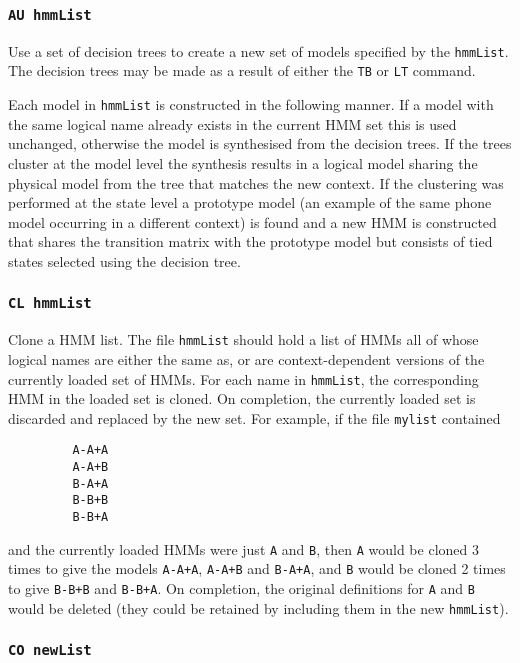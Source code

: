 \subsubsection*{\tt AU hmmList}

Use a set of decision trees to create a new set of models specified
by the \texttt{hmmList}.  The decision trees may be made as a result
of either the \texttt{TB} or \texttt{LT} command.  

Each model in \texttt{hmmList} is constructed in the following manner.
If a model with the same logical name already exists in the
current  HMM set this is used unchanged, otherwise the model is
synthesised from the decision trees.  If the trees cluster at the 
model level the synthesis results in a logical model sharing the
physical model from the tree that matches the new context.  If
the clustering was performed at the state level a prototype model
(an example of the same phone model occurring in a different context)
is found and a new HMM is constructed  that shares the transition
matrix with the prototype model but consists of tied states selected
using the decision tree.

\subsubsection*{\tt CL hmmList}

Clone a HMM list.  The file \texttt{hmmList} should hold a list of HMMs
all of whose logical names are either the same as, or are context-dependent
versions of the currently loaded set of HMMs.  For each name in \texttt{hmmList},
the corresponding HMM in the loaded set is cloned.  On completion, the
currently loaded set is discarded and replaced by the new set.  For example,
if the file \texttt{mylist} contained
\begin{verbatim}
         A-A+A
         A-A+B
         B-A+A
         B-B+B
         B-B+A
\end{verbatim}
and the currently loaded HMMs were just \texttt{A} and \texttt{B}, then
\texttt{A} would be cloned 3 times to give the models \texttt{A-A+A},
\texttt{A-A+B} and \texttt{B-A+A}, and \texttt{B} would be cloned 2 times
to give \texttt{B-B+B} and \texttt{B-B+A}.  On completion, the original
definitions for \texttt{A} and \texttt{B} would be deleted (they could
be retained by including them in the new \texttt{hmmList}).

\subsubsection*{\tt CO newList}

